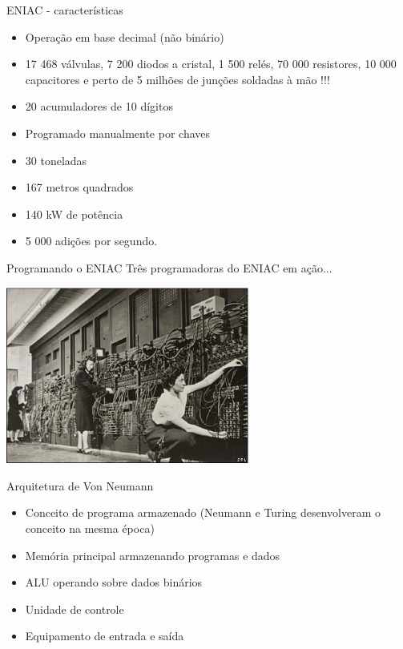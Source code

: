 \begin{slide}[toc=]{ENIAC - características}
   \begin{itemize}
      \item Operação em base decimal (não binário)
      \item 17 468 válvulas, 7 200 diodos a cristal, 1 500 relés, 70 000 resistores, 10 000 capacitores e perto de  5 milhões de junções soldadas à mão !!!
      \item 20 acumuladores de 10 dígitos
      \item Programado manualmente por chaves
      \item 30 toneladas
      \item 167 metros quadrados
      \item 140 kW de potência
      \item 5 000 adições por segundo.
   \end{itemize}
\end{slide}
\begin{note}{Programando o ENIAC}
   Três programadoras do ENIAC em ação...\\
   \begin{center}
      \includegraphics[width=0.6\textwidth]{figs/eniac.eps}  
   \end{center}
\end{note}


\begin{slide}[toc=]{Arquitetura de Von Neumann}
\begin{itemize}
	\item Conceito de programa armazenado (Neumann e Turing desenvolveram o conceito na mesma época)
	\item Memória principal armazenando programas e dados
	\item ALU operando sobre dados binários
	\item Unidade de controle
	\item Equipamento de entrada e saída
\end{itemize}
\end{slide}

